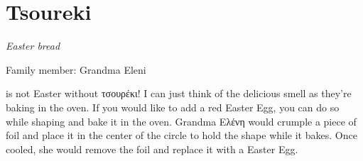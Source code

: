\chapter{Tsoureki}
\label{ch:tsoureki}


\textit{Easter bread}

Family member: Grandma Eleni

 is not Easter without \textgreek{τσουρέκι}! I can just think of the delicious smell as they're baking in the oven. If you would like to add a red Easter Egg, you can do so while shaping and bake it in the oven. Grandma \textgreek{Ελένη} would crumple a piece of foil and place it in the center of the circle to hold the shape while it bakes. Once cooled, she would remove the foil and replace it with a Easter Egg.

